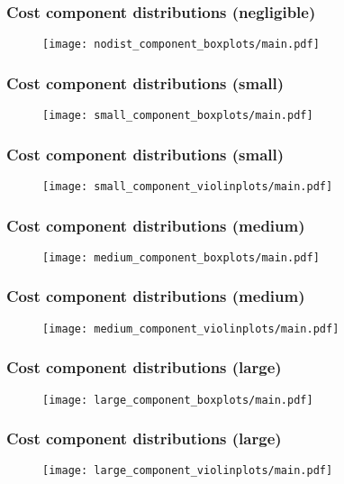 \begin{frame}
    \frametitle{Cost component distributions (negligible)}

    \begin{figure}
    \texttt{[image: nodist\_component\_boxplots/main.pdf]}
    \end{figure}
\end{frame}


\begin{frame}
    \frametitle{Cost component distributions (small)}

    \begin{figure}
    \texttt{[image: small\_component\_boxplots/main.pdf]}
    \end{figure}
\end{frame}

\begin{frame}
    \frametitle{Cost component distributions (small)}

    \begin{figure}
    \texttt{[image: small\_component\_violinplots/main.pdf]}
    \end{figure}
\end{frame}


\begin{frame}
    \frametitle{Cost component distributions (medium)}

    \begin{figure}
    \texttt{[image: medium\_component\_boxplots/main.pdf]}
    \end{figure}
\end{frame}

\begin{frame}
    \frametitle{Cost component distributions (medium)}

    \begin{figure}
    \texttt{[image: medium\_component\_violinplots/main.pdf]}
    \end{figure}
\end{frame}


\begin{frame}
    \frametitle{Cost component distributions (large)}

    \begin{figure}
    \texttt{[image: large\_component\_boxplots/main.pdf]}
    \end{figure}
\end{frame}

\begin{frame}
    \frametitle{Cost component distributions (large)}

    \begin{figure}
    \texttt{[image: large\_component\_violinplots/main.pdf]}
    \end{figure}
\end{frame}
